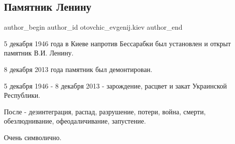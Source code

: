  
 
 
 
 
 
\subsection{Памятник Ленину}
\label{sec:05_12_2021.fb.otovchic_evgenij.kiev.1.pamjatnik_leninu}
 
\ifcmt
 author_begin
   author_id otovchic_evgenij.kiev
 author_end
\fi

5 декабря 1946 года в Киеве напротив Бессарабки был установлен и открыт
памятник В.И. Ленину.

8 декабря 2013 года памятник был демонтирован.


5 декабря 1946 - 8 декабря 2013 - зарождение, расцвет и закат Украинской
Республики.

После - дезинтеграция, распад, разрушение, потери, война, смерти,
обезлюднивание, офеодаличивание, запустение.

Очень символично.

